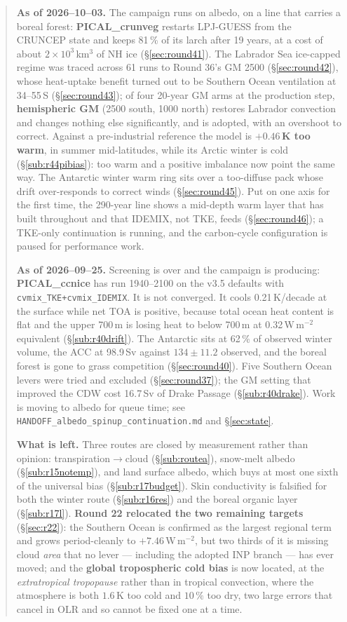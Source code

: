 \documentclass[10pt]{article}
\begin{document}
\begin{abstract}
\medskip\noindent\textbf{As of 2026--10--03.} The campaign runs on albedo, on a line
that carries a boreal forest: \textbf{PICAL\_crunveg} restarts LPJ-GUESS from the CRUNCEP state
and keeps 81\,\% of its larch after 19 years, at a cost of about $2\times10^3$\,km$^3$ of NH ice
(\S\ref{sec:round41}). The Labrador Sea ice-capped regime was traced across 61 runs to Round 36's
GM 2500 (\S\ref{sec:round42}), whose heat-uptake benefit turned out to be Southern Ocean
ventilation at 34--55\,S (\S\ref{sec:round43}); of four 20-year GM arms at the production step,
\textbf{hemispheric GM} (2500 south, 1000 north) restores Labrador convection and changes nothing
else significantly, and is adopted, with an overshoot to correct. Against a pre-industrial
reference the model is \textbf{$+0.46$\,K too warm}, in summer mid-latitudes, while its Arctic winter
is cold (\S\ref{sub:r44pibias}): too warm and a positive imbalance now point the same way. The
Antarctic winter warm ring sits over a too-diffuse pack whose drift over-responds to correct winds
(\S\ref{sec:round45}). Put on one axis for the first time, the 290-year line shows a mid-depth
warm layer that has built throughout and that IDEMIX, not TKE, feeds (\S\ref{sec:round46}); a
TKE-only continuation is running, and the carbon-cycle configuration is paused for performance work.

\medskip\noindent\textbf{As of 2026--09--25.} Screening is over and the campaign is
producing: \textbf{PICAL\_ccnice} has run 1940--2100 on the v3.5 defaults with
\texttt{cvmix\_TKE+cvmix\_IDEMIX}. It is not converged. It cools 0.21\,K/decade at the surface
while net TOA is positive, because total ocean heat content is flat and the upper 700\,m is
losing heat to below 700\,m at 0.32\,W\,m$^{-2}$ equivalent (\S\ref{sub:r40drift}). The
Antarctic sits at 62\,\% of observed winter volume, the ACC at 98.9\,Sv against
$134\pm11.2$ observed, and the boreal forest is gone to grass competition
(\S\ref{sec:round40}). Five Southern Ocean levers were tried and excluded
(\S\ref{sec:round37}); the GM setting that improved the CDW cost 16.7\,Sv of Drake Passage
(\S\ref{sub:r40drake}). Work is moving to albedo for queue time; see
\texttt{HANDOFF\_albedo\_spinup\_continuation.md} and \S\ref{sec:state}.

\medskip\noindent\textbf{What is left.} Three routes are closed by measurement rather than
opinion: transpiration$\to$cloud (\S\ref{sub:routea}), snow-melt albedo
(\S\ref{sub:r15notemp}), and land surface albedo, which buys at most one sixth of the
universal bias (\S\ref{sub:r17budget}). Skin conductivity is falsified for both the winter
route (\S\ref{sub:r16res}) and the boreal organic layer (\S\ref{sub:r17l}). \textbf{Round 22
relocated the two remaining targets} (\S\ref{sec:r22}): the Southern Ocean is confirmed as
the largest regional term and grows period-cleanly to $+7.46$\,W\,m$^{-2}$, but two thirds
of it is missing cloud \emph{area} that no lever --- including the adopted INP branch ---
has ever moved; and the \textbf{global tropospheric cold bias} is now located, at the
\emph{extratropical tropopause} rather than in tropical convection, where the atmosphere is
both $1.6$\,K too cold and $10\,\%$ too dry, two large errors that cancel in OLR and so
cannot be fixed one at a time.


\end{abstract}
\end{document}
